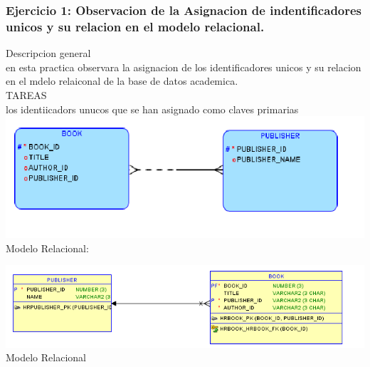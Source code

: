 \documentclass[12pt,letterpaper]{article}
\begin{document}
\subsubsection{Ejercicio 1: Observacion de la Asignacion de indentificadores unicos y su relacion en el modelo relacional.} 
Descripcion general \\
en esta practica observara la asignacion de los identificadores unicos y su relacion en el mdelo relaiconal de la base de datos academica. \\
TAREAS\\
los identiicadors unucos que se han asignado como claves primarias\\
 \includegraphics[width=15cm]{./giselaImagen/imagen1.png} 
		\\ Modelo Relacional:
		
 \includegraphics[width=15cm]{./giselaImagen/imagen2.png} 
		\\ Modelo Relacional
\end{document}
